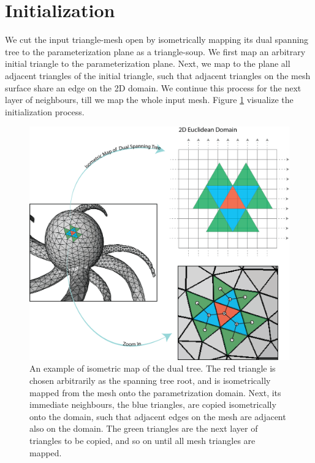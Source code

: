 \section{Initialization}
We cut the input triangle-mesh open by isometrically mapping its dual spanning tree to the parameterization plane as a triangle-soup. We first map an arbitrary initial triangle to the parameterization plane. Next, we map to the plane all adjacent triangles of the initial triangle, such that adjacent triangles on the mesh surface share an edge on the 2D domain. We continue this process for the next layer of neighbours, till we map the whole input mesh. Figure \ref{fig:initialization} visualize the initialization process.
\begin{figure}[ht]
\centering
\includegraphics[width=13cm]{figures/initialization.png}
\caption[Triangle Soup Initialization]{An example of isometric map of the dual tree. The red triangle is chosen arbitrarily as the spanning tree root, and is isometrically mapped from the mesh onto the parametrization domain. Next, its immediate neighbours, the blue triangles, are copied isometrically onto the domain, such that adjacent edges on the mesh are adjacent also on the domain. The green triangles are the next layer of triangles to be copied, and so on until all mesh triangles are mapped.}
\label{fig:initialization}
\end{figure}
